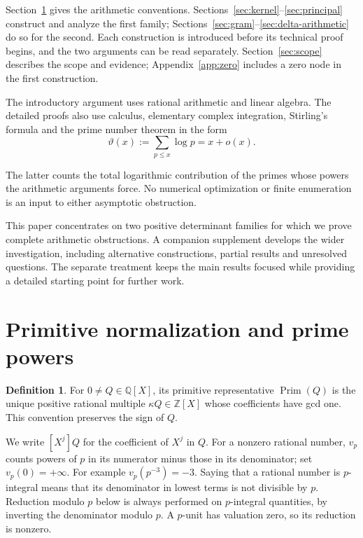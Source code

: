 \documentclass[11pt]{article}
\theoremstyle{definition}
\newtheorem{definition}[theorem]{Definition}
\theoremstyle{remark}
\numberwithin{equation}{section}
\newcommand{\Q}{\mathbb Q}
\newcommand{\Z}{\mathbb Z}
\newcommand{\vp}{v_p}
\newcommand{\PP}{\operatorname{Prim}}
\begin{document}
Section~\ref{sec:normalization} gives the arithmetic conventions.
Sections~\ref{sec:kernel}--\ref{sec:principal} construct and analyze
the first family; Sections~\ref{sec:gram}--\ref{sec:delta-arithmetic}
do so for the second. Each construction is introduced before its
technical proof begins, and the two arguments can be read separately.
Section~\ref{sec:scope} describes the scope and evidence; Appendix~\ref{app:zero}
includes a zero node in the first construction.

\begin{samepage}
The introductory argument uses rational arithmetic and linear algebra.
The detailed proofs also use calculus, elementary complex integration,
Stirling's formula and the prime number theorem in the form
\begin{equation}\label{eq:PNT}
 \vartheta(x):=\sum_{p\leq x}\log p=x+o(x).
\end{equation}
\end{samepage}
The latter counts the total logarithmic contribution of the primes
whose powers the arithmetic arguments force. No numerical optimization
or finite enumeration is an input to either asymptotic obstruction.

This paper concentrates on two positive determinant families for which
we prove complete arithmetic obstructions. A companion supplement
\cite{Supplement} develops the wider investigation, including alternative
constructions, partial results and unresolved questions. The separate
treatment keeps the main results focused while providing a detailed
starting point for further work.

\section{Primitive normalization and prime powers}\label{sec:normalization}

\begin{definition}
For $0\ne Q\in\Q[X]$, its primitive representative $\PP(Q)$ is the
unique positive rational multiple $\kappa Q\in\Z[X]$ whose coefficients
have gcd one. This convention preserves the sign of $Q$.
\end{definition}

We write $[X^j]Q$ for the coefficient of $X^j$ in $Q$.
For a nonzero rational number, $\vp$ counts powers of $p$ in its
numerator minus those in its denominator; set $\vp(0)=+\infty$.
For example $v_p(p^{-3})=-3$. Saying that a rational
number is $p$-integral means that its denominator in lowest terms is not
divisible by $p$. Reduction modulo $p$ below is always performed on
$p$-integral quantities, by inverting the denominator modulo $p$.
A $p$-unit has valuation zero, so its reduction is nonzero.
\end{document}
